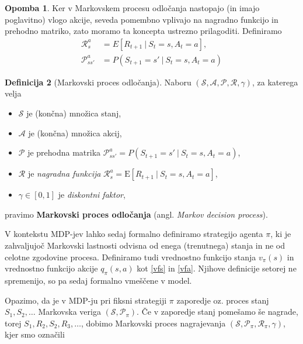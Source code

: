 \documentclass[12pt,a4paper]{amsart}
\theoremstyle{definition} %
\newtheorem{definicija}{Definicija}[section]
\newtheorem{opomba}[definicija]{Opomba}
\theoremstyle{plain} %
\begin{document}
\begin{opomba}
    Ker v Markovskem procesu odločanja nastopajo (in imajo poglavitno) vlogo akcije, seveda pomembno 
    vplivajo na nagradno funkcijo in prehodno matriko, zato moramo ta koncepta ustrezno prilagoditi. 
    Definiramo
    \begin{align*}
    \mathcal{R}_s^a &= E[R_{t+1}~|~S_{t} = s, A_t = a], \\
    \mathcal{P}_{ss'}^a &= P(S_{t+1} = s'~|~S_t = s, A_t = a)
    \end{align*}
\end{opomba}

\begin{definicija}[Markovski proces odločanja]
    Naboru $(\mathcal{S}, \mathcal{A}, \mathcal{P}, \mathcal{R}, \gamma)$, za katerega velja
    \begin{itemize}
        \item $\mathcal{S}$ je (končna) množica stanj,
        \item $\mathcal{A}$ je (končna) množica akcij, 
        \item $\mathcal{P}$ je prehodna matrika $\mathcal{P}_{ss'}^a = P(S_{t+1} = s'~|~
                S_t = s, A_t = a)$, 
        \item $\mathcal{R}$ je \textit{nagradna funkcija} 
                $\mathcal{R}_s^a = \mathrm{E}[R_{t+1}~|~S_{t} = s, A_t = a]$, 
        \item $\gamma \in [0,1]$ je \textit{diskontni faktor}, 
    \end{itemize}
    pravimo \textbf{Markovski proces odločanja} (angl. \textit{Markov decision process}).
\end{definicija}

V kontekstu MDP-jev lahko sedaj formalno definiramo strategijo agenta $\pi$, ki je zahvaljujoč 
Markovski lastnosti odvisna od enega (trenutnega) stanja in ne od celotne zgodovine procesa. 
Definiramo tudi vrednostno funkcijo stanja $v_{\pi}(s)$ in vrednostno funkcijo akcije $q_{\pi}(s, a)$ 
kot \eqref{vfs} in \eqref{vfa}. Njihove definicije setorej ne spremenijo, so pa sedaj formalno 
vmeščene v model.

Opazimo, da je v MDP-ju pri fiksni strategiji $\pi$ zaporedje oz. proces stanj $S_1, S_2, \dots$ 
Markovska veriga $(\mathcal{S}, \mathcal{P}_\pi)$. Če v zaporedje stanj pomešamo še nagrade, 
torej $S_1, R_2, S_2, R_3, \dots$, dobimo Markovski proces nagrajevanja $(\mathcal{S}, 
\mathcal{P}_\pi, \mathcal{R}_\pi, \gamma)$, kjer smo označili
\end{document}
